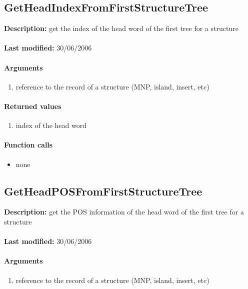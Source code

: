 \subsection{GetHeadIndexFromFirstStructureTree}
\textbf{Description:} get the index of the head word of the first tree for a structure\\
\\\textbf{Last modified:} 30/06/2006

\paragraph{Arguments}
\begin{enumerate}
\item reference to the record of a structure (MNP, island, insert, etc)
\end{enumerate}

\paragraph{Returned values}
\begin{enumerate}
\item index of the head word
\end{enumerate}

\paragraph{Function calls}
\begin{itemize}
\item none
\end{itemize}

\subsection{GetHeadPOSFromFirstStructureTree}
\textbf{Description:} get the POS information of the head word of the first tree for a structure\\
\\\textbf{Last modified:} 30/06/2006

\paragraph{Arguments}
\begin{enumerate}
\item reference to the record of a structure (MNP, island, insert, etc)
\end{enumerate}

